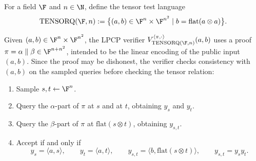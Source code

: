 \begin{definition}\label{TENSORQ}\leanok
For a field \(\F\) and \(n \in \N\), define the tensor test language
\[
  \mathrm{TENSORQ}(\F, n) :=
    \bigl\{ (a, b) \in \F^n \times \F^{n^2} \mid b = \mathrm{flat}(a \otimes a) \bigr\}.
\]
\end{definition}

\begin{definition}\label{TENSORQ.verifier}\leanok
Given \((a,b) \in \F^n \times \F^{n^2}\), the LPCP verifier
\(V_{\mathrm{TENSORQ}(\F,n)}^{\langle \pi,\cdot\rangle}(a,b)\) uses a proof
\(\pi=\alpha\parallel\beta \in \F^{n+n^2}\), intended to be the linear encoding of the public input
\((a,b)\). Since the proof may be dishonest, the verifier checks consistency with \((a,b)\) on the sampled
queries before checking the tensor relation:
\begin{enumerate}
  \item Sample \(s,t \leftarrow \F^n\).
  \item Query the \(\alpha\)-part of \(\pi\) at \(s\) and at \(t\), obtaining \(y_s\) and \(y_t\).
  \item Query the \(\beta\)-part of \(\pi\) at \(\mathrm{flat}(s\otimes t)\), obtaining \(y_{s,t}\).
  \item Accept if and only if
  \[
      y_s=\langle a,s\rangle,\qquad
      y_t=\langle a,t\rangle,\qquad
      y_{s,t}=\langle b,\mathrm{flat}(s\otimes t)\rangle,\qquad
      y_{s,t}=y_s y_t.
    \]
\end{enumerate}
\end{definition}


